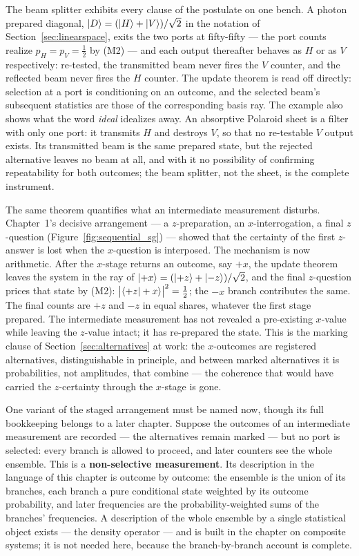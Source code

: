 The beam splitter exhibits every clause of the postulate on one bench. A photon prepared diagonal, $\ket{D} = (\ket{H}+\ket{V})/\sqrt{2}$ in the notation of Section~\ref{sec:linearspace}, exits the two ports at fifty-fifty --- the port counts realize $p_H = p_V = \tfrac12$ by (M2) --- and each output thereafter behaves as $H$ or as $V$ respectively: re-tested, the transmitted beam never fires the $V$ counter, and the reflected beam never fires the $H$ counter. The update theorem is read off directly: selection at a port is conditioning on an outcome, and the selected beam's subsequent statistics are those of the corresponding basis ray. The example also shows what the word \emph{ideal} idealizes away. An absorptive Polaroid sheet is a filter with only one port: it transmits $H$ and destroys $V$, so that no re-testable $V$ output exists. Its transmitted beam is the same prepared state, but the rejected alternative leaves no beam at all, and with it no possibility of confirming repeatability for both outcomes; the beam splitter, not the sheet, is the complete instrument.

The same theorem quantifies what an intermediate measurement disturbs. Chapter~1's decisive arrangement --- a $z$-preparation, an $x$-interrogation, a final $z$-question (Figure~\ref{fig:sequential_sg}) --- showed that the certainty of the first $z$-answer is lost when the $x$-question is interposed. The mechanism is now arithmetic. After the $x$-stage returns an outcome, say $+x$, the update theorem leaves the system in the ray of $\ket{+x} = (\ket{+z}+\ket{-z})/\sqrt{2}$, and the final $z$-question prices that state by (M2): $\bigl|\braket{+z|+x}\bigr|^2 = \tfrac12$; the $-x$ branch contributes the same. The final counts are $+z$ and $-z$ in equal shares, whatever the first stage prepared. The intermediate measurement has not revealed a pre-existing $x$-value while leaving the $z$-value intact; it has re-prepared the state. This is the marking clause of Section~\ref{sec:alternatives} at work: the $x$-outcomes are registered alternatives, distinguishable in principle, and between marked alternatives it is probabilities, not amplitudes, that combine --- the coherence that would have carried the $z$-certainty through the $x$-stage is gone.

One variant of the staged arrangement must be named now, though its full bookkeeping belongs to a later chapter. Suppose the outcomes of an intermediate measurement are recorded --- the alternatives remain marked --- but no port is selected: every branch is allowed to proceed, and later counters see the whole ensemble. This is a \textbf{non-selective measurement}. Its description in the language of this chapter is outcome by outcome: the ensemble is the union of its branches, each branch a pure conditional state weighted by its outcome probability, and later frequencies are the probability-weighted sums of the branches' frequencies. A description of the whole ensemble by a single statistical object exists --- the density operator --- and is built in the chapter on composite systems; it is not needed here, because the branch-by-branch account is complete.

